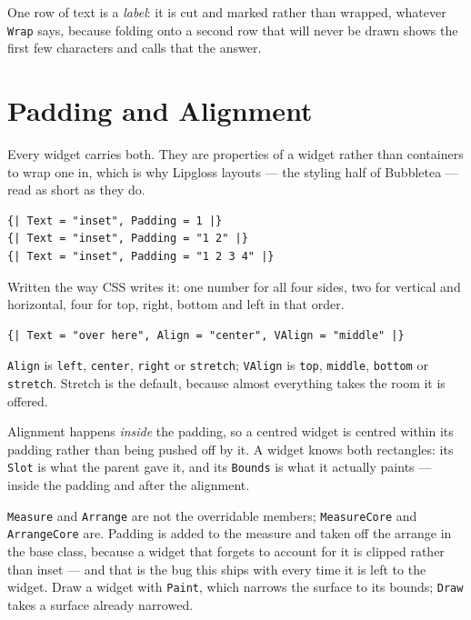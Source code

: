 \documentclass[11pt,a4paper,twoside,openany]{book}
\newcommand{\code}[1]{\texttt{\small #1}}
\begin{document}
\begin{tipbox}
One row of text is a \emph{label}: it is cut and marked rather than wrapped,
whatever \code{Wrap} says, because folding onto a second row that will never be
drawn shows the first few characters and calls that the answer.
\end{tipbox}

\section{Padding and Alignment}

Every widget carries both. They are properties of a widget rather than containers to
wrap one in, which is why Lipgloss layouts --- the styling half of Bubbletea --- read
as short as they do.

\begin{lstlisting}
{| Text = "inset", Padding = 1 |}
{| Text = "inset", Padding = "1 2" |}
{| Text = "inset", Padding = "1 2 3 4" |}
\end{lstlisting}

Written the way CSS writes it: one number for all four sides, two for vertical and
horizontal, four for top, right, bottom and left in that order.

\begin{lstlisting}
{| Text = "over here", Align = "center", VAlign = "middle" |}
\end{lstlisting}

\code{Align} is \code{left}, \code{center}, \code{right} or \code{stretch};
\code{VAlign} is \code{top}, \code{middle}, \code{bottom} or \code{stretch}.
Stretch is the default, because almost everything takes the room it is offered.

Alignment happens \emph{inside} the padding, so a centred widget is centred within
its padding rather than being pushed off by it. A widget knows both rectangles: its
\code{Slot} is what the parent gave it, and its \code{Bounds} is what it actually
paints --- inside the padding and after the alignment.

\begin{notebox}
\code{Measure} and \code{Arrange} are not the overridable members; \code{MeasureCore}
and \code{ArrangeCore} are. Padding is added to the measure and taken off the arrange
in the base class, because a widget that forgets to account for it is clipped rather
than inset --- and that is the bug this ships with every time it is left to the widget.
Draw a widget with \code{Paint}, which narrows the surface to its bounds;
\code{Draw} takes a surface already narrowed.
\end{notebox}
\end{document}
